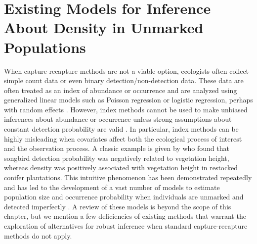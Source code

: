 \section{Existing Models for Inference About Density in Unmarked Populations}
\label{Sect.existing-unmarked}
When capture-recapture methods are not a viable option, ecologists
often collect simple count data or even binary detection/non-detection
data. %
These data are often treated as an index of abundance or occurrence
and are analyzed using generalized linear models such as
Poisson regression or logistic regression, perhaps with random
effects \citep{zuur_etal:2009}. %
However, index methods cannot be used to make unbiased inferences
about abundance or occurrence unless strong assumptions about constant
detection probability are valid
\citep{williams_etal:2002,sollmann_etal:2013bioc}.
In particular,
index methods can be highly misleading
when covariates affect both the ecological process of interest
and the observation process. A classic example is given by
\citet{bibby_buckland:1987} who found that songbird detection
probability was negatively related to vegetation height, whereas
density was positively associated with vegetation height in restocked
conifer plantations. This intuitive phenomenon has been
demonstrated repeatedly \citep[e.g.][]{kery:2008,sillett_etal:2012} and has led to the
development of a vast number of models to estimate population size and
occurrence probability when individuals are unmarked and detected
imperfectly
\citep{buckland_etal:2001,williams_etal:2002,mackenzie_etal:2006,royle_dorazio:2008}.
A review of these
models is beyond the scope of this
chapter, but we mention a few deficiencies of existing methods
that warrant the exploration of alternatives for robust inference when
standard capture-recapture methods do not apply.

